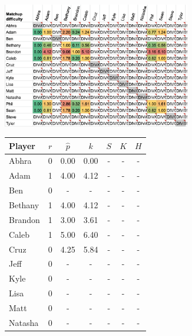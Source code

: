 \documentclass[letterpaper, 10 pt, conference]{ieeeconf}  %
\begin{document}
\begin{figure}[hb]
        \centering
        \begin{subfigure}[h]{0.5\textwidth}
        \includegraphics[width=0.9\textwidth]{fig/difficulty_1.png}
        \end{subfigure}
        \begin{subfigure}[h]{0.4\textwidth}
                \footnotesize
                \centering
                \begin{tabular}{lccc|ccc}
                        \toprule
                        Player  & $r$   & $\hat{p}$ & $k$ & $S$ & $K$ & $H$\\
                        \midrule
                        Abhra	& 0	& 0.00	& 0.00 & - & - & - \\
                        Adam	& 1	& 4.00	& 4.12 & - & - & - \\
                        Ben	& 0	& -	& -    & - & - & - \\
                        Bethany	& 1	& 4.00	& 4.12 & - & - & - \\
                        Brandon	& 1	& 3.00	& 3.61 & - & - & - \\
                        Caleb	& 1	& 5.00	& 6.40 & - & - & - \\
                        Cruz	& 0	& 4.25	& 5.84 & - & - & - \\
                        Jeff	& 0	& -	& -    & - & - & - \\
                        Kyle	& 0	& -  	& -    & - & - & - \\
                        Lisa	& 0	& -  	& -    & - & - & - \\
                        Matt	& 0	& -  	& -    & - & - & - \\
                        Natasha	& 0	& -  	& -    & - & - & - \\

\end{tabular}
\end{subfigure}
\end{figure}
\end{document}
